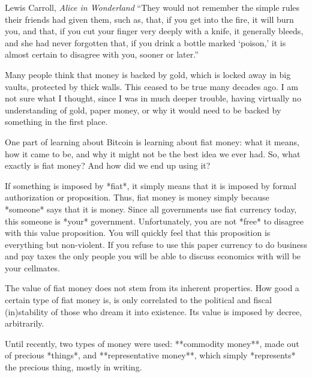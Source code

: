 \label{les:12}

\begin{chapquote}{Lewis Carroll, \textit{Alice in Wonderland}}
``They would not remember the simple rules their friends had given them, such
as, that, if you get into the fire, it will burn you, and that, if you cut your
finger very deeply with a knife, it generally bleeds, and she had never
forgotten that, if you drink a bottle marked `poison,' it is almost certain to
disagree with you, sooner or later.''
\end{chapquote}

Many people think that money is backed by gold, which is locked away in
big vaults, protected by thick
walls. This ceased to be true many decades ago. I am not sure what I
thought, since I was in much deeper trouble, having virtually no
understanding of gold, paper money, or why it would need to be backed by
something in the first place.

One part of learning about Bitcoin is learning about fiat money: what it
means, how it came to be, and why it might not be the best idea we ever
had. So, what exactly is fiat money? And how did we end up using it?

If something is imposed by *fiat*, it simply means that it is imposed by
formal authorization or proposition. Thus, fiat money is money simply
because *someone* says that it is money. Since all governments use fiat
currency today, this someone is *your* government. Unfortunately, you
are not *free* to disagree with this value proposition. You will quickly
feel that this proposition is everything but non-violent. If you refuse
to use this paper currency to do business and pay taxes the only people
you will be able to discuss economics with will be your cellmates.

The value of fiat money does not stem from its inherent properties. How
good a certain type of fiat money is, is only correlated to the
political and fiscal (in)stability of those who dream it into existence.
Its value is imposed by decree, arbitrarily.


Until recently, two types of money were used: **commodity money**, made
out of precious *things*, and **representative money**, which simply
*represents* the precious thing, mostly in writing.

